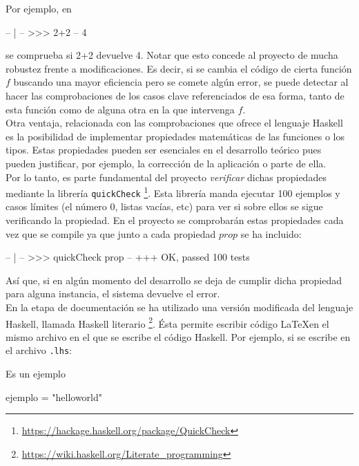 \newpage

Por ejemplo, en

\begin{code}
-- | 
-- >>> 2+2
-- 4
\end{code}

\noindent se comprueba si 2+2 devuelve 4. Notar que esto concede al proyecto de mucha robustez frente a modificaciones. Es decir, si se cambia el código de cierta función $f$ buscando una mayor eficiencia pero se comete algún error, se puede detectar al hacer las comprobaciones de los casos clave referenciados de esa forma, tanto de esta función como de alguna otra en la que intervenga $f$.\\

Otra ventaja, relacionada con las comprobaciones que ofrece el lenguaje Haskell es la posibilidad de implementar propiedades matemáticas de las funciones o los tipos. Estas propiedades pueden ser esenciales en el desarrollo teórico pues pueden justificar, por ejemplo, la corrección de la aplicación o parte de ella.\\

Por lo tanto, es parte fundamental del proyecto \textit{verificar} dichas propiedades mediante la librería \texttt{quickCheck} \footnote{\url{https://hackage.haskell.org/package/QuickCheck}}. Esta librería manda ejecutar 100 ejemplos y casos límites (el número 0, listas vacías, etc) para ver si sobre ellos se sigue verificando la propiedad. En el proyecto se comprobarán estas propiedades cada vez que se compile ya que junto a cada propiedad $prop$ se ha incluido:

\begin{code}
-- | 
-- >>> quickCheck prop
--  +++ OK, passed 100 tests
\end{code}

Así que, si en algún momento del desarrollo se deja de cumplir dicha propiedad para alguna instancia, el sistema devuelve el error.\\

En la etapa de documentación se ha utilizado una versión modificada del lenguaje Haskell, llamada Haskell literario \footnote{\url{https://wiki.haskell.org/Literate_programming}}. Ésta permite escribir código \LaTeX en el mismo archivo en el que se escribe el código Haskell. Por ejemplo, si se escribe en el archivo \texttt{.lhs}:

\begin{codigo}
Es un ejemplo
\begin{code}
ejemplo = "helloworld"
\end{code}
\end{codigo}

